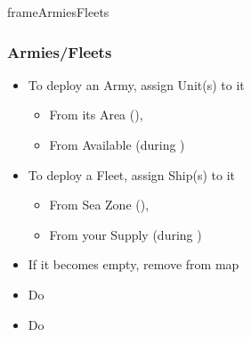 \documentclass[10pt]{article}
\begin{document}
\begin{dynamiccontents*}{frameArmiesFleets}
	\subsubsection*{Armies/Fleets }
	\begin{itemize}
		\item To deploy an Army, assign Unit(s) to it 
		\begin{itemize}
			\item From its Area (), 
			\item From Available \manpower (during )
		\end{itemize}
		\item To deploy a Fleet, assign Ship(s) to it
		\begin{itemize}
			\item From Sea Zone (), 
			\item From your Supply (during )
		\end{itemize}
		\item If it becomes empty, remove from map
	\end{itemize}
\end{dynamiccontents*}

\begin{itemize}
	\item Do   
\end{itemize}

\begin{itemize}
	\item Do   
\end{itemize}
\end{document}
